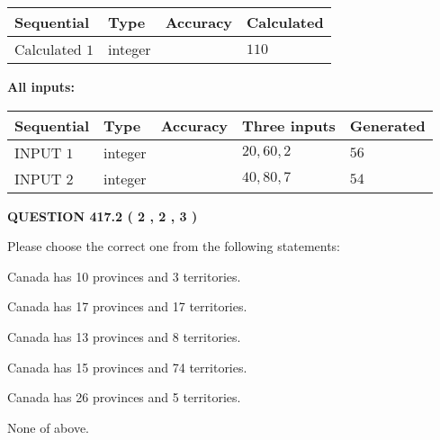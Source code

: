 \documentclass[12pt]{article}
\begin{document}
   
   
   
\noindent{}
   
   
  
  
\noindent\begin{tabular}{|l|l|l|l|}
\hline
 Sequential & Type & Accuracy & Calculated \\ 
\hline
 
 
  Calculated $  1 $ & integer &  & 
  $ 110 $ 
 \\  \hline  
 \end{tabular}
   
   
   
   
\noindent\vspace{0.1in}\hspace{-0.08in} {\textbf{\Large{All inputs: }}}
   
   
  
  
\noindent\begin{tabular}{|l|l|l|l|l|}
\hline
 Sequential & Type & Accuracy & Three inputs & Generated \\ 
\hline
 
 
  INPUT $  1 $ & integer &  & $
 20
 , 
 60
 , 
 2
 $ & $ 56 $ 
 \\  \hline  
 
 
  INPUT $  2 $ & integer &  & $
 40
 , 
 80
 , 
 7
 $ & $ 54 $ 
 \\  \hline  
 \end{tabular}
   
   
  
\vspace{0.2in}
  
{\textbf{\Large{QUESTION
417.2 
 ( 2 , 2 , 3 )
}}}
  
  
Please choose the correct one from the following statements:
 
 
Canada has 10  provinces and 3 territories.
 
 
Canada has  17 provinces and  17 territories.
 
 
Canada has  13 provinces and  8 territories.
 
 
Canada has  15 provinces and  74 territories.
 
 
Canada has  26 provinces and  5 territories.
 
 
 None of above.
 
\end{document}
